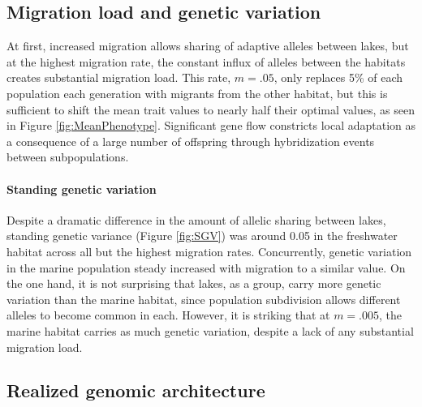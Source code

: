 \documentclass{article}
\begin{document}
\subsection*{Migration load and genetic variation}


At first, increased migration allows sharing of adaptive alleles between lakes, but at the highest migration rate, the constant influx of alleles between the habitats creates substantial migration load. This rate, $m=.05$, only replaces 5\% of each population each generation with migrants from the other habitat, but this is sufficient to shift the mean trait values to nearly half their optimal values, as seen in Figure \ref{fig:MeanPhenotype}. Significant gene flow constricts local adaptation as a consequence of a large number of offspring through hybridization events between subpopulations.

\paragraph{Standing genetic variation} Despite a dramatic difference in the amount of allelic sharing between lakes, standing genetic variance (Figure \ref{fig:SGV}) was around 0.05 in the freshwater habitat across all but the highest migration rates. Concurrently, genetic variation in the marine population steady increased with migration
to a similar value. On the one hand, it is not surprising that lakes, as a group, carry more genetic variation than the marine habitat, since population subdivision allows different alleles to become common in each. However, it is striking that at $m=.005$, the marine habitat carries as much genetic variation, despite a lack of any substantial migration load.


\subsection*{Realized genomic architecture}
\end{document}
